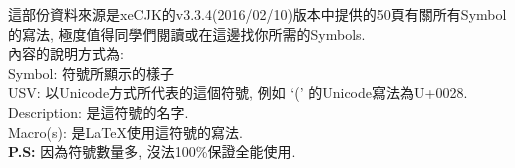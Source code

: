 
這部份資料來源是xeCJK的v3.3.4(2016/02/10)版本中提供的50頁有關所有Symbol的寫法, 極度值得同學們閱讀或在這邊找你所需的Symbols.\\

內容的說明方式為:\\
Symbol: 符號所顯示的樣子\\
USV: 以Unicode方式所代表的這個符號, 例如 `(' 的Unicode寫法為U+0028.\\
Description: 是這符號的名字.\\
Macro(s): 是LaTeX使用這符號的寫法.\\

\textbf{P.S: }因為符號數量多, 沒法100\%保證全能使用.



\EndChapter
